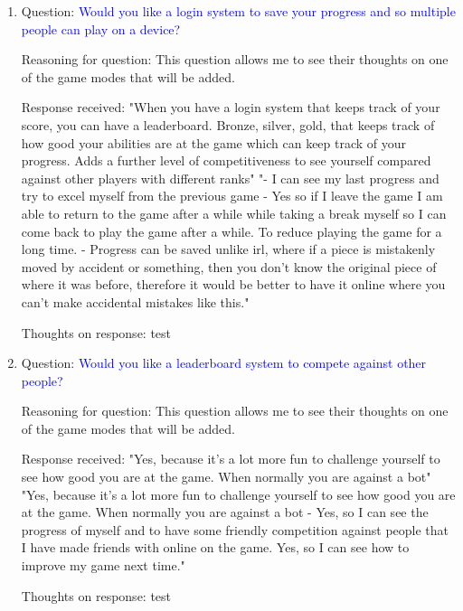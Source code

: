 \documentclass[11pt,a4paper]{report}
\begin{document}
\begin{enumerate}
    \colorbox{l-purple}{Thoughts on response:} \noindent \textcolor{d-purple}{test}




    \item \colorbox{l-blue}{Question:} \textcolor{blue}{Would you like a login system to save your progress and so multiple people can play on a device?}

    \colorbox{l-green}{Reasoning for question:} \textcolor{dark-green}{This question allows me to see their thoughts on one of the game modes that will be added.}

    \colorbox{l-red}{Response received:} \noindent \textcolor{crimson-red}{"When you have a login system that keeps track of your score, you can have a leaderboard. Bronze, silver, gold, that keeps track of how good your abilities are at the game which can keep track of your progress. Adds a further level of competitiveness to see yourself compared against other players with different ranks" \newline "- I can see my last progress and try to excel myself from the previous game
    - Yes so if I leave the game I am able to return to the game after a while while taking a break myself so I can come back to play the game after a while. To reduce playing the game for a long time.
    - Progress can be saved unlike irl, where if a piece is mistakenly moved by accident or something, then you don't know the original piece of where it was before, therefore it would be better to have it online where you can't make accidental mistakes like this."}

    \colorbox{l-purple}{Thoughts on response:} \noindent \textcolor{d-purple}{test}



    \item \colorbox{l-blue}{Question:} \textcolor{blue}{Would you like a leaderboard system to compete against other people?}

    \colorbox{l-green}{Reasoning for question:} \textcolor{dark-green}{This question allows me to see their thoughts on one of the game modes that will be added.}

    \colorbox{l-red}{Response received:} \noindent \textcolor{crimson-red}{"Yes, because it's a lot more fun to challenge yourself to see how good you are at the game. When normally you are against a bot" \newline "Yes, because it's a lot more fun to challenge yourself to see how good you are at the game. When normally you are against a bot
    - Yes, so I can see the progress of myself and to have some friendly competition against people that I have made friends with online on the game.
Yes, so I can see how to improve my game next time."}

    \colorbox{l-purple}{Thoughts on response:} \noindent \textcolor{d-purple}{test}



\end{enumerate}
\end{document}
